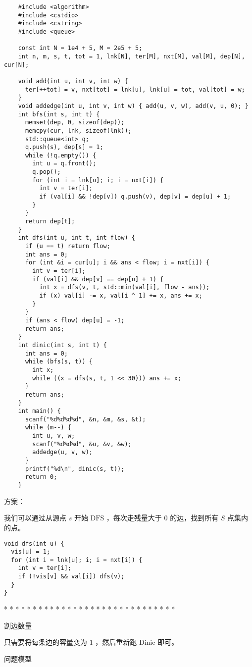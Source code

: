 \begin{lstlisting}
    #include <algorithm>
    #include <cstdio>
    #include <cstring>
    #include <queue>
    
    const int N = 1e4 + 5, M = 2e5 + 5;
    int n, m, s, t, tot = 1, lnk[N], ter[M], nxt[M], val[M], dep[N], cur[N];
    
    void add(int u, int v, int w) {
      ter[++tot] = v, nxt[tot] = lnk[u], lnk[u] = tot, val[tot] = w;
    }
    void addedge(int u, int v, int w) { add(u, v, w), add(v, u, 0); }
    int bfs(int s, int t) {
      memset(dep, 0, sizeof(dep));
      memcpy(cur, lnk, sizeof(lnk));
      std::queue<int> q;
      q.push(s), dep[s] = 1;
      while (!q.empty()) {
        int u = q.front();
        q.pop();
        for (int i = lnk[u]; i; i = nxt[i]) {
          int v = ter[i];
          if (val[i] && !dep[v]) q.push(v), dep[v] = dep[u] + 1;
        }
      }
      return dep[t];
    }
    int dfs(int u, int t, int flow) {
      if (u == t) return flow;
      int ans = 0;
      for (int &i = cur[u]; i && ans < flow; i = nxt[i]) {
        int v = ter[i];
        if (val[i] && dep[v] == dep[u] + 1) {
          int x = dfs(v, t, std::min(val[i], flow - ans));
          if (x) val[i] -= x, val[i ^ 1] += x, ans += x;
        }
      }
      if (ans < flow) dep[u] = -1;
      return ans;
    }
    int dinic(int s, int t) {
      int ans = 0;
      while (bfs(s, t)) {
        int x;
        while ((x = dfs(s, t, 1 << 30))) ans += x;
      }
      return ans;
    }
    int main() {
      scanf("%d%d%d%d", &n, &m, &s, &t);
      while (m--) {
        int u, v, w;
        scanf("%d%d%d", &u, &v, &w);
        addedge(u, v, w);
      }
      printf("%d\n", dinic(s, t));
      return 0;
    }
\end{lstlisting}

方案：

我们可以通过从源点 $s$ 开始 $\text{DFS}$ ，每次走残量大于 $0$ 的边，找到所有 $S$ 点集内的点。

\begin{lstlisting}
void dfs(int u) {
  vis[u] = 1;
  for (int i = lnk[u]; i; i = nxt[i]) {
    int v = ter[i];
    if (!vis[v] && val[i]) dfs(v);
  }
}
\end{lstlisting}

* * * * * * * * * * * * * * * * * * * * * * * * * * * * * *

割边数量

只需要将每条边的容量变为 $1$ ，然后重新跑 $\text{Dinic}$ 即可。

问题模型

